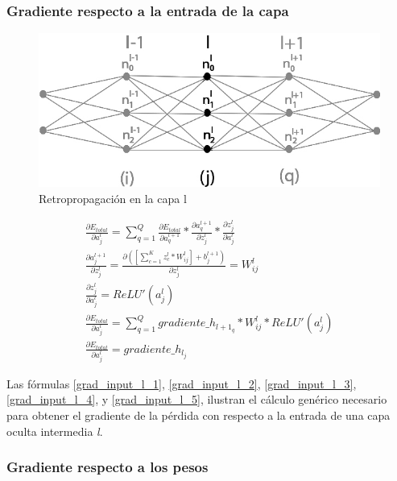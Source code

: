 \subsubsection{Gradiente respecto a la entrada de la capa}

\begin{figure}[H]
	\centering
	\includegraphics[scale=0.35]{imagenes/conclusion_capa_l.jpg}  
	\caption{Retropropagación en la capa l}
	\label{fig:conclusion_capa_l}
\end{figure}

\begin{gather}
	\frac{\partial E_{total}}{\partial a^l_j} = \sum_{q=1}^Q \frac{\partial E_{total}}{\partial a^{l+1}_q} * \frac{\partial a^{l+1}_q}{\partial z^l_j} * \frac{\partial z^l_j}{\partial a^l_j} \label{grad_input_l_1} \\
	\frac{\partial a^{l+1}_j }{\partial z^l_j } = \frac{\partial ([\sum_{c=1}^{K} z^l_c * W^l_{ij}] + b^{l+1}_j) }{\partial z^l_j } = W^l_{ij} \label{grad_input_l_2} \\
	\frac{\partial z^l_j}{\partial a^l_j} = ReLU'(a^l_j) \label{grad_input_l_3} \\
	\frac{\partial E_{total}}{\partial a^l_j} = \sum_{q=1}^Q  gradiente\_h_{{l+1}_q} * W^l_{ij} * ReLU'(a^l_j) \label{grad_input_l_4} \\
	\frac{\partial E_{total}}{\partial a^l_j} = gradiente\_h_{l_j} \label{grad_input_l_5}
\end{gather}

Las fórmulas \ref{grad_input_l_1}, \ref{grad_input_l_2}, \ref{grad_input_l_3},  \ref{grad_input_l_4}, y \ref{grad_input_l_5}, ilustran el cálculo genérico necesario para obtener el gradiente de la pérdida con respecto a la entrada de una capa oculta intermedia \textit{l}.

\subsubsection{Gradiente respecto a los pesos}

